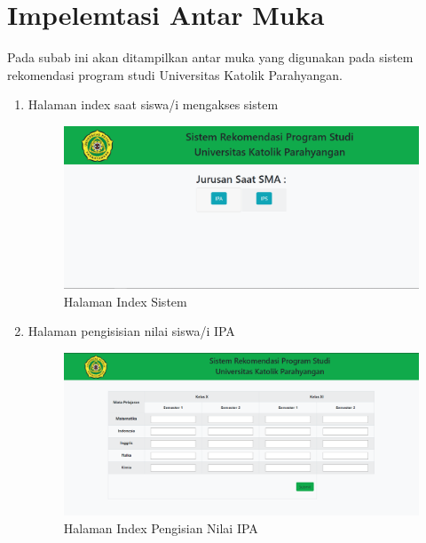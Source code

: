 \section{Impelemtasi Antar Muka}
\label{sec:implementasi antar muka}

Pada subab ini akan ditampilkan antar muka yang digunakan pada sistem rekomendasi program studi Universitas Katolik Parahyangan.

\begin{enumerate}
    \item Halaman index saat siswa/i mengakses sistem
    
    \begin{figure}[H]
        \centering
        \includegraphics[width = 12cm, height =8 cm]{doc/DokumenSkripsi/Gambar/gambar51.png}
        \caption{Halaman Index Sistem}
        \label{fig:gambar51}
    \end{figure}
    
    \item Halaman pengisisian nilai siswa/i IPA
    
    \begin{figure}[H]
        \centering
        \includegraphics[width = 12cm, height =8 cm]{doc/DokumenSkripsi/Gambar/gambar52.png}
        \caption{Halaman Index Pengisian Nilai IPA}
        \label{fig:gambar52}
    \end{figure}
    

\end{enumerate}
